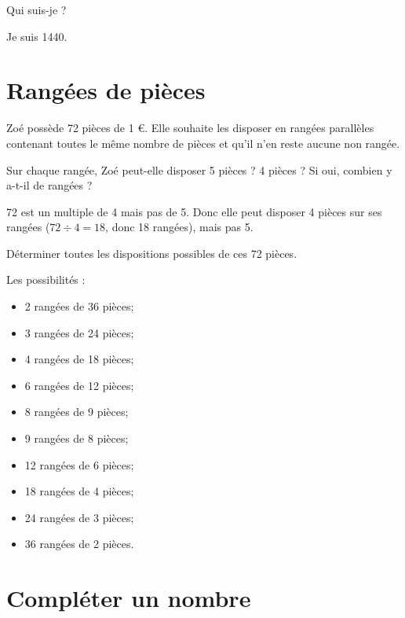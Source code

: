 \documentclass[a4paper,11pt]{exam}
\begin{document}
	
	\begin{questions}
		\question Qui suis-je ?
		\begin{solution}
			Je suis \num{1440}.
		\end{solution}
	\end{questions}
	
	
\section{Rangées de pièces}
	Zoé possède 72 pièces de 1 €. Elle souhaite les disposer en rangées parallèles contenant toutes le même nombre de pièces et qu'il n'en reste aucune non rangée.
	
	\begin{questions}
		\question Sur chaque rangée, Zoé peut-elle disposer 5 pièces ? 4 pièces ? Si oui, combien y a-t-il de rangées ?
		\begin{solution}
			72 est un multiple de 4 mais pas de 5. Donc elle peut disposer 4 pièces sur ses rangées ($72 \div 4 = 18$, donc 18 rangées), mais pas 5.
		\end{solution}
		
		\question Déterminer toutes les dispositions possibles de ces 72 pièces.
		\begin{solution}
			Les possibilités :
			\begin{multicols}{2}
				\begin{itemize}
					\item 2 rangées de 36 pièces;
					\item 3 rangées de 24 pièces;
					\item 4 rangées de 18 pièces;
					\item 6 rangées de 12 pièces;
					\item 8 rangées de 9 pièces;
					\item 9 rangées de 8 pièces;
					\item 12 rangées de 6 pièces;
					\item 18 rangées de 4 pièces;
					\item 24 rangées de 3 pièces;
					\item 36 rangées de 2 pièces.
				\end{itemize}
			\end{multicols}
			
		\end{solution}
	\end{questions}
	
	\section{Compléter un nombre}
	
\end{document}
